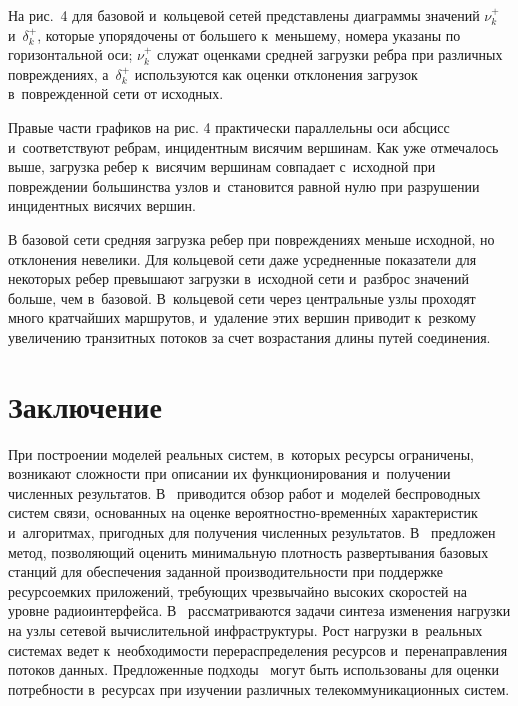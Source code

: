\begin{multicols}{2}
На рис.~4 для базовой и~кольцевой  сетей пред\-став\-ле\-ны диаграммы значений 
$\nu_k^+$ и~$\delta_k^+$, которые упорядочены от большего к~меньшему, номера 
указаны по горизонтальной оси; $\nu_k^+$ служат оценками средней загрузки ребра 
при различных по\-вреж\-де\-ниях, а~$\delta_k^+$ используются как оценки отклонения 
загрузок в~по\-вреж\-ден\-ной сети от исходных.

Правые части графиков на рис. 4 практически параллельны оси абсцисс 
и~соответствуют ребрам, инцидентным висячим вершинам. Как уже отмечалось выше, 
загрузка ребер к~висячим вершинам совпадает с~исходной при по\-вреж\-де\-нии 
большинства узлов и~становится равной нулю при разрушении инцидентных висячих 
вершин.

В базовой сети средняя загрузка ребер при по\-вреж\-де\-ни\-ях меньше исходной, но 
отклонения невелики.  Для кольцевой сети даже усредненные показатели для 
некоторых ребер превышают загрузки в~исходной сети и~разброс значений больше, 
чем в~базовой. В~кольцевой сети  через центральные узлы проходят много 
кратчайших маршрутов, и~удаление этих вершин приводит к~резкому увеличению 
транзитных потоков за счет возрастания длины путей соединения.

\vspace*{-4pt}

\section{Заключение}

\vspace*{-2pt}

При построении моделей реальных сис\-тем, в~которых ресурсы ограничены, возникают 
сложности при описании их функционирования и~получении численных результатов.
В~\cite{Gorb-18} приводится обзор работ и~моделей беспроводных сис\-тем связи, 
основанных на оценке ве\-ро\-ят\-ност\-но-вре\-мен\-н$\acute{\mbox{ы}}$х характеристик и~алгоритмах, 
пригодных для получения численных результатов.
В~\cite{Shor-22} предложен\linebreak
 метод, позволяющий оценить минимальную плот\-ность 
развертывания базовых станций для обес\-печения заданной производительности при 
под\-держке ресурсоемких приложений, требующих \mbox{чрезвычайно} высоких скоростей на 
уровне радиоинтерфейса.
В~\cite{Gor-23, Gor-17} рассматриваются задачи \mbox{синтеза} изменения нагрузки на 
узлы сетевой вычислительной инфраструктуры. Рост нагрузки в~реальных системах 
ведет к~необходимости перераспределения ресурсов и~перенаправления потоков 
данных. Предложенные подходы~\cite{Gor-23, Gor-17} могут быть использованы для 
оценки потребности в~ресурсах при изуче\-нии  различных телекоммуникационных 
сис\-тем.


\end{multicols}
